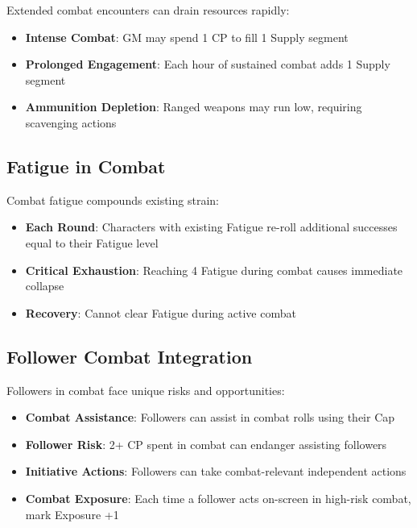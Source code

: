 Extended combat encounters can drain resources rapidly:

\begin{itemize}
    \item \textbf{Intense Combat}: GM may spend 1 CP to fill 1 Supply segment
    \item \textbf{Prolonged Engagement}: Each hour of sustained combat adds 1 Supply segment
    \item \textbf{Ammunition Depletion}: Ranged weapons may run low, requiring scavenging actions
\end{itemize}

\subsection*{Fatigue in Combat}

Combat fatigue compounds existing strain:

\begin{itemize}
    \item \textbf{Each Round}: Characters with existing Fatigue re-roll additional successes equal to their Fatigue level
    \item \textbf{Critical Exhaustion}: Reaching 4 Fatigue during combat causes immediate collapse
    \item \textbf{Recovery}: Cannot clear Fatigue during active combat
\end{itemize}

\subsection*{Follower Combat Integration}

Followers in combat face unique risks and opportunities:

\begin{itemize}
    \item \textbf{Combat Assistance}: Followers can assist in combat rolls using their Cap
    \item \textbf{Follower Risk}: 2+ CP spent in combat can endanger assisting followers
    \item \textbf{Initiative Actions}: Followers can take combat-relevant independent actions
    \item \textbf{Combat Exposure}: Each time a follower acts on-screen in high-risk combat, mark Exposure +1
\end{itemize}

